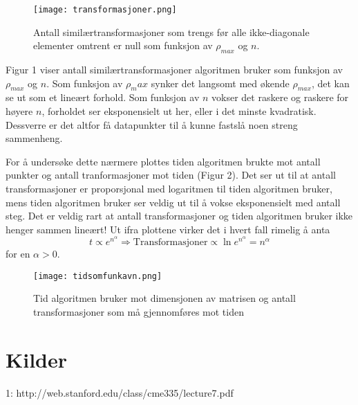 \documentclass[norsk, 12pt]{article}
\begin{document}
\begin{figure}
 \centering
 \texttt{[image: transformasjoner.png]}
 \caption{Antall similærtransformasjoner som trengs før alle ikke-diagonale elementer omtrent er null som funksjon av
 $\rho_{max}$ og $n$.}
\end{figure}

Figur 1 viser antall similærtransformasjoner algoritmen bruker som funksjon av $\rho_{max}$ og $n$. Som funksjon av $\rho_max$
synker det langsomt med økende $\rho_{max}$, det kan se ut som et lineært forhold. Som funksjon av $n$ vokser det 
raskere og raskere for høyere $n$, forholdet ser eksponensielt ut her, eller i det minste kvadratisk. Dessverre er det altfor få datapunkter til å kunne
fastslå noen streng sammenheng.

For å undersøke dette nærmere plottes tiden algoritmen brukte mot antall punkter og antall tranformasjoner mot tiden
(Figur 2). Det ser ut til at antall transformasjoner er proporsjonal med logaritmen til tiden algoritmen bruker, mens
tiden algoritmen bruker ser veldig ut til å vokse eksponensielt med antall steg. Det er veldig rart at antall
transformasjoner og tiden algoritmen bruker ikke henger sammen lineært! Ut ifra plottene virker det i hvert fall
rimelig å anta
$$t\propto e^{n^\alpha}\Rightarrow \text{Transformasjoner} \propto \ln e^{n^\alpha} = n^\alpha $$
for en $\alpha>0$.

\begin{figure}
 \centering
 \texttt{[image: tidsomfunkavn.png]}
 \caption{Tid algoritmen bruker mot dimensjonen av matrisen og antall transformasjoner som må gjennomføres mot tiden}
\end{figure}



\section{Kilder}
1: http://web.stanford.edu/class/cme335/lecture7.pdf
\end{document}
